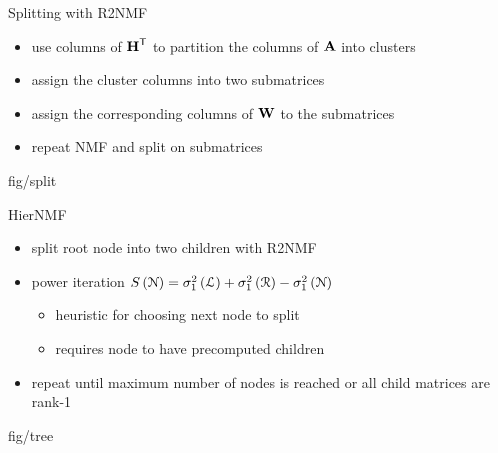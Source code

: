 \documentclass{beamer}
\begin{document}
\begin{frame}{Splitting with R2NMF}
    \begin{itemize}
        \item use columns of $\M{H}^\Tra$ to partition the columns of $\M{A}$ into clusters
        \item assign the cluster columns into two submatrices
        \item assign the corresponding columns of $\M{W}$ to the submatrices
        \item repeat NMF and split on submatrices
    \end{itemize}
    \begin{adjustbox}{max totalsize={.7\textwidth}{.6\textheight},center}
        {fig/split}
    \end{adjustbox}
\end{frame}

\begin{frame}{HierNMF}
    \begin{itemize}
        \item split root node into two children with R2NMF
        \item power iteration $S\left(\cal N\right) = \sigma_1^2\left(\cal L\right) +
        \sigma_1^2\left(\cal R\right) -
        \sigma_1^2\left(\cal N\right)$
        \begin{itemize}
            \item heuristic for choosing next node to split
            \item requires node to have precomputed children
        \end{itemize}
        \item repeat until maximum number of nodes is reached or all child matrices are rank-1
    \end{itemize}
    \begin{adjustbox}{max totalsize={.7\textwidth}{.6\textheight},center}
        {fig/tree}
    \end{adjustbox}
\end{frame}
\end{document}
